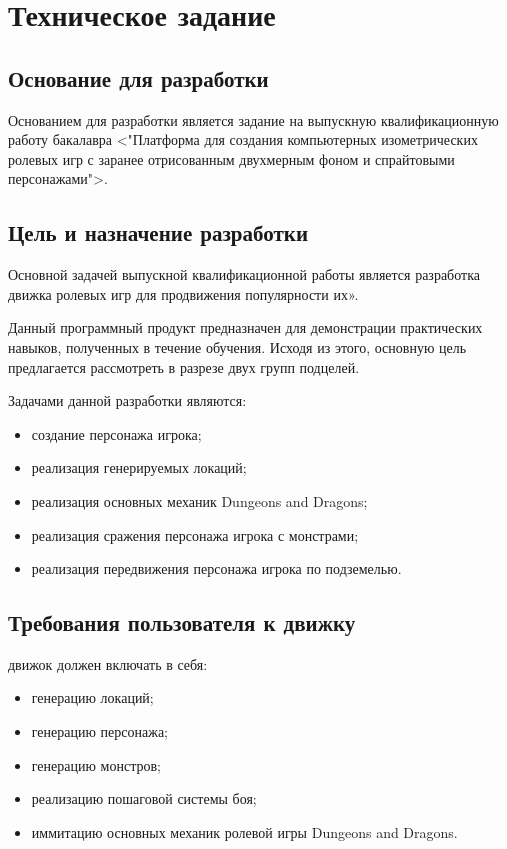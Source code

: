 \section{Техническое задание}
\subsection{Основание для разработки}

Основанием для разработки является задание на выпускную квалификационную работу бакалавра <"Платформа для создания компьютерных изометрических ролевых игр с заранее отрисованным двухмерным фоном и спрайтовыми персонажами">.

\subsection{Цель и назначение разработки}

Основной задачей выпускной квалификационной работы является разработка движка ролевых игр для продвижения популярности их».

 Данный программный продукт предназначен для демонстрации практических навыков, полученных в течение обучения. Исходя из этого, основную цель предлагается рассмотреть в разрезе двух групп подцелей.

Задачами данной разработки являются:
\begin{itemize}
\item создание персонажа игрока;
\item реализация генерируемых локаций;
\item реализация основных механик Dungeons and Dragons;
\item реализация сражения персонажа игрока с монстрами;
\item реализация передвижения персонажа игрока по подземелью.
\end{itemize}

\subsection{Требования пользователя к движку}

движок должен включать в себя:
\begin{itemize}
    \item генерацию локаций;
    \item генерацию персонажа;
    \item генерацию монстров;
    \item реализацию пошаговой системы боя;
    \item иммитацию основных механик ролевой игры Dungeons and Dragons.
\end{itemize}




